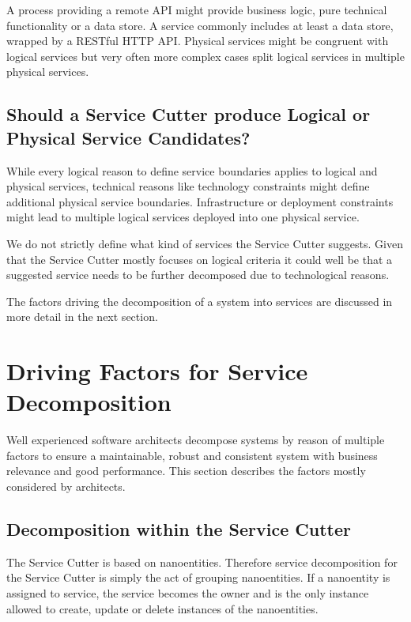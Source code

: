 A process providing a remote API might provide business logic, pure technical functionality or a data store. A service commonly includes at least a data store, wrapped by a RESTful HTTP API. Physical services might be congruent with logical services but very often more complex cases split logical services in multiple physical services. 

\subsection{Should a Service Cutter produce Logical or Physical Service Candidates?}

While every logical reason to define service boundaries applies to logical and physical services, technical reasons like technology constraints might define additional physical service boundaries. Infrastructure or deployment constraints might lead to multiple logical services deployed into one physical service. %

We do not strictly define what kind of services the Service Cutter suggests. Given that the Service Cutter mostly focuses on logical criteria it could well be that a suggested service needs to be further decomposed due to technological reasons.

The factors driving the decomposition of a system into services are discussed in more detail in the next section.


\section{Driving Factors for Service Decomposition}

Well experienced software architects decompose systems by reason of multiple factors to ensure a maintainable, robust and consistent system with business relevance and good performance. This section describes the factors mostly considered by architects. 

\subsection{Decomposition within the Service Cutter}

The Service Cutter is based on nanoentities. Therefore service decomposition for the Service Cutter is simply the act of grouping nanoentities. If a nanoentity is assigned to service, the service becomes the owner and is the only instance allowed to create, update or delete instances of the nanoentities.

